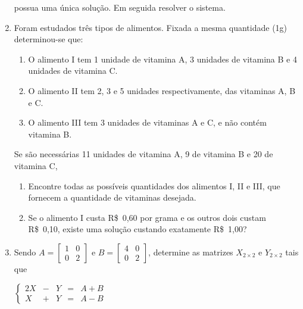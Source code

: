 \documentclass{article}
\begin{document}
\begin{enumerate}
possua uma \'unica solu\c{c}\~ao. Em seguida resolver o sistema.

\item Foram estudados tr\^es tipos de alimentos. Fixada a mesma quantidade (1g)
	determinou-se que:

\begin{enumerate}[label=\roman*.]
	\item O alimento I tem 1 unidade de vitamina A, 3 unidades de vitamina B e
		4 unidades de vitamina C.
	\item O alimento II tem 2, 3 e 5 unidades respectivamente, das vitaminas A,
		B e C.
	\item O alimento III tem 3 unidades de vitaminas A e C, e n\~ao cont\'em
		vitamina B.
\end{enumerate}

Se s\~ao necess\'arias 11 unidades de vitamina A, 9 de vitamina B e 20 de vitamina C,

\begin{enumerate}[label=\alph*.]
	\item Encontre todas as poss\'iveis quantidades dos alimentos I, II e III,
		que fornecem a quantidade de vitaminas desejada.
	\item Se o alimento I custa R\$~0,60 por grama e os outros dois custam
		R\$~0,10, existe uma solu\c{c}\~ao custando exatamente R\$~1,00?
\end{enumerate}


\item Sendo
$A = \left[\begin{array}{cc}
	1 & 0 \\
	0 & 2
\end{array}\right]$ e 
$B = \left[\begin{array}{cc}
	4 & 0 \\
	0 & 2
\end{array}\right]$,
determine as matrizes $X_{2\times{} 2}$ e $Y_{2\times{} 2}$ tais que 

$\left\{\begin{array}{ccccl}
	2X & - & Y & = & A + B \\
	X & + & Y & = & A - B
\end{array}\right.$

\end{enumerate}
\end{document}
